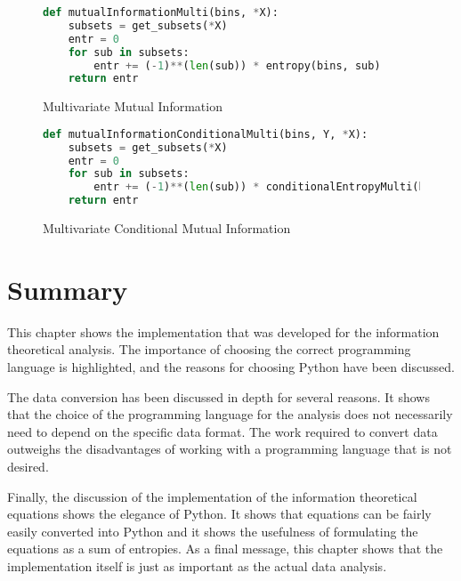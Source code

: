\begin{figure}[H]
\caption{Multivariate Mutual Information}
\label{impl:mulmutual}
\begin{lstlisting}[language=Python]
def mutualInformationMulti(bins, *X):
    subsets = get_subsets(*X)
    entr = 0
    for sub in subsets:
        entr += (-1)**(len(sub)) * entropy(bins, sub)
    return entr
\end{lstlisting}
\end{figure}

\begin{figure}[H]
\caption{Multivariate Conditional Mutual Information}
\label{impl:mulcondmutual}
\begin{lstlisting}[language=Python]
def mutualInformationConditionalMulti(bins, Y, *X):
    subsets = get_subsets(*X)
    entr = 0
    for sub in subsets:
        entr += (-1)**(len(sub)) * conditionalEntropyMulti(bins, sub, [Y])
    return entr
\end{lstlisting}
\end{figure}

\section{Summary}

This chapter shows the implementation that was developed for the information theoretical analysis. The importance of choosing the correct programming language is highlighted, and the reasons for choosing Python have been discussed. 

The data conversion has been discussed in depth for several reasons. It shows that the choice of the programming language for the analysis does not necessarily need to depend on the specific data format. The work required to convert data outweighs the disadvantages of working with a programming language that is not desired.

Finally, the discussion of the implementation of the information theoretical equations shows the elegance of Python. It shows that equations can be fairly easily converted into Python and it shows the usefulness of formulating the equations as a sum of entropies. As a final message, this chapter shows that the implementation itself is just as important as the actual data analysis.